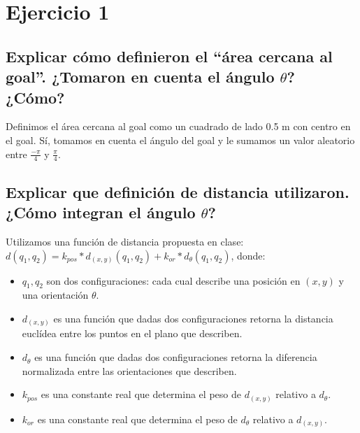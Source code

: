 \documentclass[a4paper]{article}
\theoremstyle{plain}
\theoremstyle{remark}
\theoremstyle{definition}
\begin{document}

\maketitle
\thispagestyle{empty}
\newpage

\section{Ejercicio 1}

\subsection{Explicar cómo definieron el ``área cercana al goal''. ¿Tomaron en cuenta el
ángulo $\theta$? ¿Cómo?}

Definimos el área cercana al goal como un cuadrado de lado 0.5 m con centro en
el goal. Sí, tomamos en cuenta el ángulo del goal y le sumamos un valor
aleatorio entre $\frac{-\pi}{4}$ y $\frac{\pi}{4}$.

\subsection{Explicar que definición de distancia utilizaron. ¿Cómo integran el ángulo $\theta$?}

Utilizamos una función de distancia propuesta en clase: $d(q_1, q_2) = k_{pos} * d_{(x, y)}(q_1, q_2) + k_{or} * d_{\theta}(q_1, q_2)$, donde: \\

\begin{itemize}
  \item{$q_1, q_2$ son dos configuraciones: cada cual describe una posición en $(x, y)$ y una orientación $\theta$.}
  \item{$d_{(x, y)}$ es una función que dadas dos configuraciones retorna la distancia euclídea entre los puntos en el plano que describen.}
  \item{$d_{\theta}$ es una función que dadas dos configuraciones retorna la diferencia normalizada entre las orientaciones que describen.}
  \item{$k_{pos}$ es una constante real que determina el peso de $d_{(x, y)}$ relativo a $d_{\theta}$.}
  \item{$k_{or}$ es una constante real que determina el peso de $d_{\theta}$ relativo a $d_{(x, y)}$.}
\end{itemize}
\end{document}
